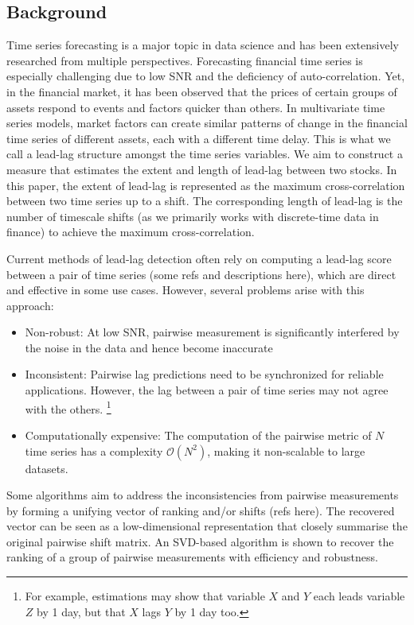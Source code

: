 \documentclass[sigconf]{acmart}
\begin{document}
\subsection{Background}
Time series forecasting is a major topic in data science and has been extensively researched from multiple perspectives. Forecasting financial time series is especially challenging due to low SNR and the deficiency of auto-correlation. Yet, in the financial market, it has been observed that the prices of certain groups of assets respond to events and factors quicker than others. In multivariate time series models, market factors can create similar patterns of change in the financial time series of different assets, each with a different time delay. This is what we call a lead-lag structure amongst the time series variables. We aim to construct a measure that estimates the extent and length of lead-lag between two stocks. In this paper, the extent of lead-lag is represented as the maximum cross-correlation between two time series up to a shift. The corresponding length of lead-lag is the number of timescale shifts (as we primarily works with discrete-time data in finance) to achieve the maximum cross-correlation. 

Current methods of lead-lag detection often rely on computing a lead-lag score between a pair of time series (some refs and descriptions here), which are direct and effective in some use cases. However, several problems arise with this approach:
\begin{itemize}
\item Non-robust: At low SNR, pairwise measurement is significantly interfered by the noise in the data and hence become inaccurate
\item Inconsistent: Pairwise lag predictions need to be synchronized for reliable applications. However, the lag between a pair of time series may not agree with the others. \footnote{For example, estimations may show that variable $X$ and $Y$ each leads variable $Z$ by 1 day, but that $X$ lags $Y$ by 1 day too.}
\item Computationally expensive: The computation of the pairwise metric of $N$ time series has a complexity $\mathcal{O}(N^2)$, making it non-scalable to large datasets.
\end{itemize}

Some algorithms aim to address the inconsistencies from pairwise measurements by forming a unifying vector of ranking and/or shifts (refs here). The recovered vector can be seen as a low-dimensional representation that closely summarise the original pairwise shift matrix. An SVD-based algorithm is shown to recover the ranking of a group of pairwise measurements with efficiency and robustness.
\end{document}

